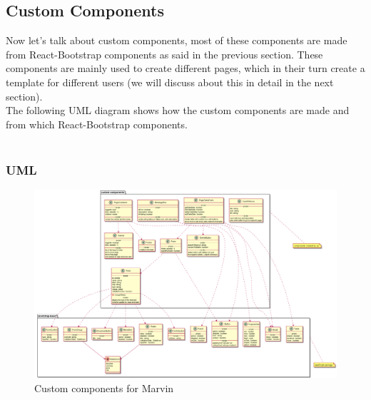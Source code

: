 	\subsection{Custom Components} Now let's talk about custom components, most of these components are made from React-Bootstrap components as said in the previous section. These components are mainly used to create different pages, which in their turn create a template for different users (we will discuss about this in detail in the next section). \\The following UML diagram shows how the custom components are made and from which React-Bootstrap components.  
	\\ \\
		\subsubsection{UML}
			\begin{figure}[h]
			\centering
			\includegraphics[width=1\linewidth]{"diagrammi/react/customComponents"}
			\caption{Custom components for Marvin}
			\label{fig:Custom components for Marvin}
		\end{figure}